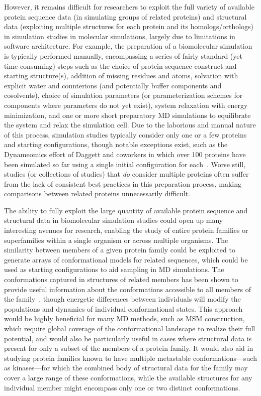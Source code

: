\documentclass[10pt,letterpaper]{article}
\begin{document}
However, it remains difficult for researchers to exploit the full variety of available protein sequence data (in simulating groups of related proteins) and structural data (exploiting multiple structures for each protein and its homologs/orthologs) in simulation studies in molecular simulations, largely due to limitations in software architecture.
For example, the preparation of a biomolecular simulation is typically performed manually, encompassing a series of fairly standard (yet time-consuming) steps such as the choice of protein sequence construct and starting structure(s), addition of missing residues and atoms, solvation with explicit water and counterions (and potentially buffer components and cosolvents), choice of simulation parameters (or parameterization schemes for components where parameters do not yet exist),  system relaxation with energy minimization, and one or more short preparatory MD simulations to equilibrate the system and relax the simulation cell.
Due to the laborious and manual nature of this process, simulation studies typically consider only one or a few proteins and starting configurations,  though notable exceptions exist, such as the Dynameomics effort of Daggett and coworkers in which over 100 proteins have been simulated so far using a single initial configuration for each~\cite{daggett:structure:2010:dynameomics}.
Worse still, studies (or collections of studies) that \emph{do} consider multiple proteins often suffer from the lack of consistent best practices in this preparation process, making comparisons between related proteins unnecessarily difficult.

The ability to fully exploit the large quantity of available protein sequence and structural data in biomolecular simulation studies could open up many interesting avenues for research, enabling the study of entire protein families or superfamilies within a single organism or across multiple organisms.
The similarity between members of a given protein family could be exploited to generate arrays of conformational models for related sequences, which could be used as starting configurations to aid sampling in MD simulations.
The conformations captured in structures of related members has been shown to provide useful information about the conformations accessible to all members of the family~\cite{friedland:plos-comput-biol:2009:conformational-dynamics,sali:2012:allostery-modeling}, though energetic differences between individuals will modify the populations and dynamics of individual conformational states.
This approach would be highly beneficial for many MD methods, such as MSM construction, which require global coverage of the conformational landscape to realize their full potential, and would also be particularly useful in cases where structural data is present for only a subset of the members of a protein family.
It would also aid in studying protein families known to have multiple metastable conformations---such as kinases---for which the combined body of structural data for the family may cover a large range of these conformations, while the available structures for any individual member might encompass only one or two distinct conformations.
\end{document}
